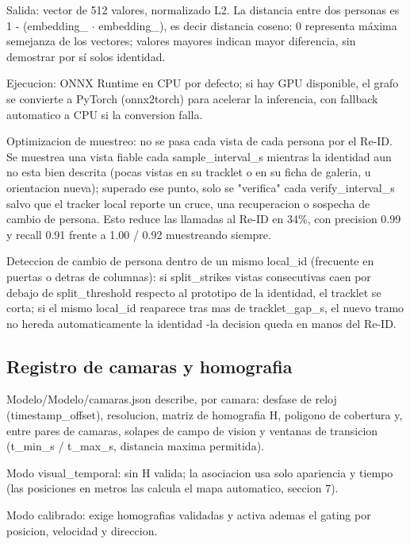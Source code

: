 \documentclass[12pt,letterpaper]{article}
\begin{document}
Salida: vector de 512 valores, normalizado L2. La distancia entre dos personas es 1 - (embedding\_ $\cdot$ embedding\_), es decir distancia coseno: 0 representa máxima semejanza de los vectores; valores mayores indican mayor diferencia, sin demostrar por sí solos identidad.


Ejecucion: ONNX Runtime en CPU por defecto; si hay GPU disponible, el grafo se convierte a PyTorch (onnx2torch) para acelerar la inferencia, con fallback automatico a CPU si la conversion falla.


Optimizacion de muestreo: no se pasa cada vista de cada persona por el Re-ID. Se muestrea una vista fiable cada sample\_\allowbreak interval\_\allowbreak s mientras la identidad aun no esta bien descrita (pocas vistas en su tracklet o en su ficha de galeria, u orientacion nueva); superado ese punto, solo se "verifica" cada verify\_\allowbreak interval\_\allowbreak s salvo que el tracker local reporte un cruce, una recuperacion o sospecha de cambio de persona. Esto reduce las llamadas al Re-ID en 34\%, con precision 0.99 y recall 0.91 frente a 1.00 / 0.92 muestreando siempre.


Deteccion de cambio de persona dentro de un mismo local\_\allowbreak id (frecuente en puertas o detras de columnas): si split\_\allowbreak strikes vistas consecutivas caen por debajo de split\_\allowbreak threshold respecto al prototipo de la identidad, el tracklet se corta; si el mismo local\_\allowbreak id reaparece tras mas de tracklet\_\allowbreak gap\_\allowbreak s, el nuevo tramo no hereda automaticamente la identidad -la decision queda en manos del Re-ID.


\subsection{Registro de camaras y homografia}

Modelo/\allowbreak Modelo/\allowbreak camaras.json describe, por camara: desfase de reloj (timestamp\_\allowbreak offset), resolucion, matriz de homografia H, poligono de cobertura y, entre pares de camaras, solapes de campo de vision y ventanas de transicion (t\_\allowbreak min\_\allowbreak s / t\_\allowbreak max\_\allowbreak s, distancia maxima permitida).


Modo visual\_\allowbreak temporal: sin H valida; la asociacion usa solo apariencia y tiempo (las posiciones en metros las calcula el mapa automatico, seccion 7).


Modo calibrado: exige homografias validadas y activa ademas el gating por posicion, velocidad y direccion.
\end{document}
